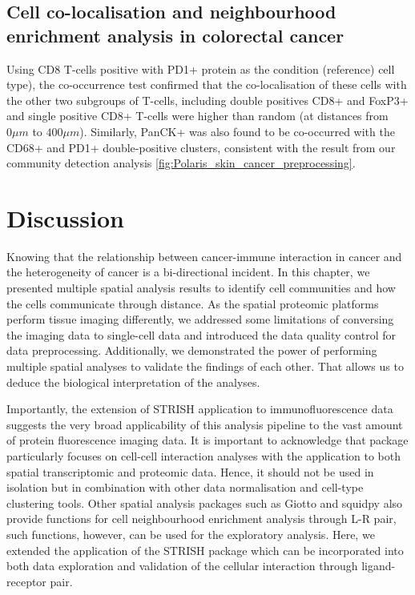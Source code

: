 \subsection{Cell co-localisation and neighbourhood enrichment analysis in colorectal cancer }
Using CD8 T-cells positive with PD1+ protein as the condition (reference) cell type), the co-occurrence test confirmed that the co-localisation of these cells with the other two subgroups of T-cells, including double positives CD8+ and FoxP3+ and single positive CD8+ T-cells were higher than random (at distances from $0\mu m$ to $400 \mu m$). Similarly, PanCK+ was also found to be co-occurred with the CD68+ and PD1+ double-positive clusters, consistent with the result from our community detection analysis \ref{fig:Polaris_skin_cancer_preprocessing}.     
\section{Discussion}
Knowing that the relationship between cancer-immune interaction in cancer and the heterogeneity of cancer is a bi-directional incident. In this chapter, we presented multiple spatial analysis results to identify cell communities and how the cells communicate through distance. As the spatial proteomic platforms perform tissue imaging differently, we addressed some limitations of conversing the imaging data to single-cell data and introduced the data quality control for data preprocessing. Additionally, we demonstrated the power of performing multiple spatial analyses to validate the findings of each other. That allows us to deduce the biological interpretation of the analyses.      

Importantly, the extension of STRISH application to immunofluorescence data suggests the very broad applicability of this analysis pipeline to the vast amount of protein fluorescence imaging data. It is important to acknowledge that package particularly focuses on cell-cell interaction analyses with the application to both spatial transcriptomic and proteomic data. Hence, it should not be used in isolation but in combination with other data normalisation and cell-type clustering tools. Other spatial analysis packages such as Giotto \cite{dries2021giotto} and squidpy \cite{palla2022squidpy} also provide functions for cell neighbourhood enrichment analysis through L-R pair, such functions, however, can be used for the exploratory analysis. Here, we extended the application of the STRISH package which can be incorporated into both data exploration and validation of the cellular interaction through ligand-receptor pair. 

